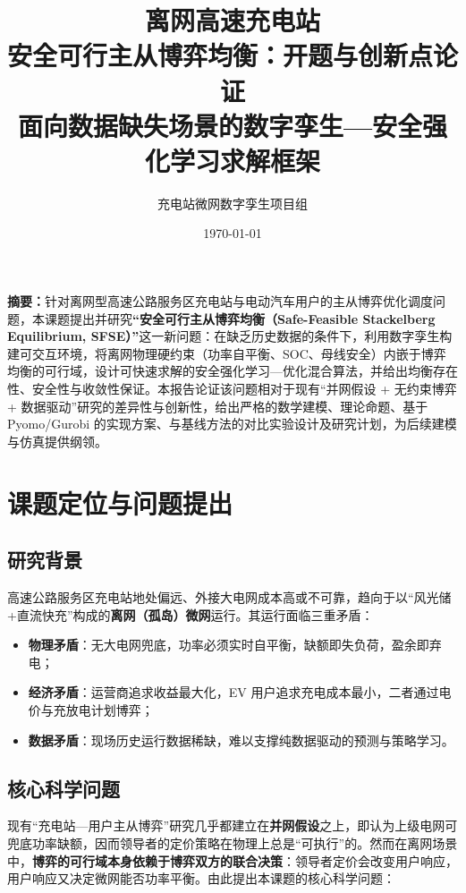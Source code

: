 \documentclass[UTF8,a4paper,11pt]{ctexart}
\title{\vspace{-1.5cm}\textbf{\color{mainblue}离网高速充电站\\安全可行主从博弈均衡：开题与创新点论证}\\[6pt]
\large 面向数据缺失场景的数字孪生—安全强化学习求解框架}
\author{充电站微网数字孪生项目组}
\date{\today}
\begin{document}
\maketitle
\thispagestyle{fancy}

\begin{center}
\begin{minipage}{0.94\textwidth}
\small
\textbf{摘要：}针对离网型高速公路服务区充电站与电动汽车用户的主从博弈优化调度问题，本课题提出并研究\textbf{“安全可行主从博弈均衡（Safe-Feasible Stackelberg Equilibrium, SFSE）”}这一新问题：在缺乏历史数据的条件下，利用数字孪生构建可交互环境，将离网物理硬约束（功率自平衡、SOC、母线安全）内嵌于博弈均衡的可行域，设计可快速求解的安全强化学习—优化混合算法，并给出均衡存在性、安全性与收敛性保证。本报告论证该问题相对于现有“并网假设 + 无约束博弈 + 数据驱动”研究的差异性与创新性，给出严格的数学建模、理论命题、基于 Pyomo/Gurobi 的实现方案、与基线方法的对比实验设计及研究计划，为后续建模与仿真提供纲领。
\end{minipage}
\end{center}

\vspace{0.4cm}

\section{课题定位与问题提出}

\subsection{研究背景}
高速公路服务区充电站地处偏远、外接大电网成本高或不可靠，趋向于以“风光储+直流快充”构成的\textbf{离网（孤岛）微网}运行。其运行面临三重矛盾：
\begin{itemize}
  \item \textbf{物理矛盾}：无大电网兜底，功率必须实时自平衡，缺额即失负荷，盈余即弃电；
  \item \textbf{经济矛盾}：运营商追求收益最大化，EV 用户追求充电成本最小，二者通过电价与充放电计划博弈；
  \item \textbf{数据矛盾}：现场历史运行数据稀缺，难以支撑纯数据驱动的预测与策略学习。
\end{itemize}

\subsection{核心科学问题}
现有“充电站—用户主从博弈”研究几乎都建立在\textbf{并网假设}之上，即认为上级电网可兜底功率缺额，因而领导者的定价策略在物理上总是“可执行”的。然而在离网场景中，\textbf{博弈的可行域本身依赖于博弈双方的联合决策}：领导者定价会改变用户响应，用户响应又决定微网能否功率平衡。由此提出本课题的核心科学问题：
\end{document}
